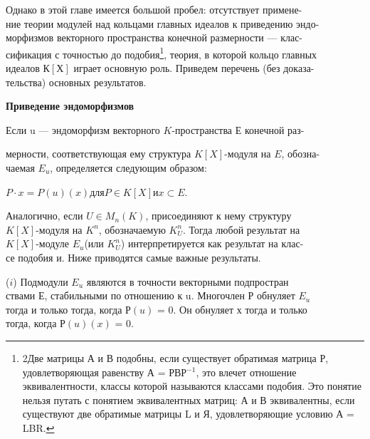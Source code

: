\documentclass{../template/mai_book}
\begin{document}
Однако в этой главе имеется большой пробел: отсутствует 
примене-\\ние теории модулей над кольцами главных идеалов к приведению 
эндо-\\морфизмов векторного пространства конечной размерности — 
клас-\\сификация с точностью до подобия\footnote{2Две матрицы А и В подобны, если существует обратимая матрица Р, 
удовлетворяющая равенству А = РВР$^{-1}$, это влечет отношение эквивалентности, классы 
которой называются классами подобия. Это понятие нельзя путать с понятием 
эквивалентных матриц: А и В эквивалентны, если существуют две обратимые матрицы 
L и Я, удовлетворяющие условию А = LBR.}, теория, в которой кольцо главных\\ идеалов $К[Х]$ играет основную роль. Приведем перечень (без 
доказа-\\тельства) основных результатов.

\medskip

{\noindent \bf Приведение эндоморфизмов} 

\medskip
Если u — эндоморфизм векторного $K$-пространства $Е$ конечной раз-


\pagebreak

\noindent мерности, соответствующая ему структура $K[X]$-модуля на $E$, 
обозна-\\чаемая $E_u$, определяется следующим образом: 

\medskip

$P\cdot x = P(u)(x)$\;\;для\;\;$P\in K[X]$\;\;и\;\;$x\subset E$. 

\medskip

\noindent Аналогично, если $ U \in M_n(K)$, присоединяют к нему структуру\\ 
$K[X]$-модуля на $K^n$, обозначаемую $K_U^n$. Тогда любой результат на\\ 
$K[X]$-модуле $E_u$(или $K_U^n$) интерпретируется как результат на 
клас-\\се подобия и. Ниже приводятся самые важные результаты.

\medskip

($\mathit{i} $) Подмодули $E_u$ являются в точности векторными 
подпростран\\ствами Е, стабильными по отношению к u. Многочлен Р обнуляет $E_u$ \\тогда и только тогда, когда $Р(u)$ = 0. Он обнуляет х тогда и только\\ тогда, когда $Р(u)(x)$ = 0. 

\medskip
\end{document}
